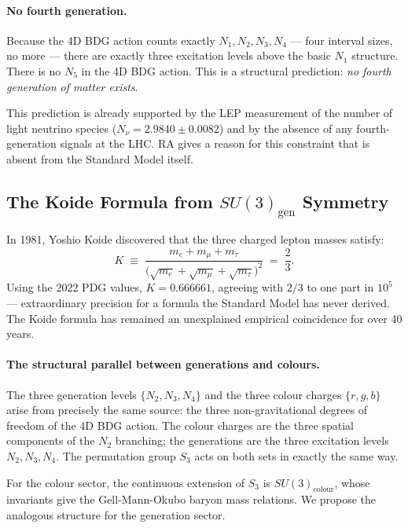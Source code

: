 \documentclass[11pt,a4paper]{article}
\begin{document}
\paragraph{No fourth generation.}
Because the 4D BDG action counts exactly $N_1, N_2, N_3, N_4$ --- four interval
sizes, no more --- there are exactly three excitation levels above the basic
$N_1$ structure. There is no $N_5$ in the 4D BDG action. This is a structural
prediction: \emph{no fourth generation of matter exists}.

This prediction is already supported by the LEP measurement of the number of
light neutrino species ($N_\nu = 2.9840 \pm 0.0082$) and by the absence of
any fourth-generation signals at the LHC. RA gives a reason for this
constraint that is absent from the Standard Model itself.

\subsection{The Koide Formula from $SU(3)_{\mathrm{gen}}$ Symmetry}
\label{sec:koide}

In 1981, Yoshio Koide discovered that the three charged lepton masses satisfy:
\begin{equation}
  K \;\equiv\; \frac{m_e + m_\mu + m_\tau}{\bigl(\sqrt{m_e} + \sqrt{m_\mu}
  + \sqrt{m_\tau}\bigr)^2} \;=\; \frac{2}{3}.
  \label{eq:koide}
\end{equation}
Using the 2022 PDG values, $K = 0.666661$, agreeing with $2/3$ to one part
in $10^5$ --- extraordinary precision for a formula the Standard Model has
never derived. The Koide formula has remained an unexplained empirical
coincidence for over 40 years.

\paragraph{The structural parallel between generations and colours.}
The three generation levels $\{N_2, N_3, N_4\}$ and the three colour charges
$\{r, g, b\}$ arise from precisely the same source: the three non-gravitational
degrees of freedom of the 4D BDG action. The colour charges are the three
spatial components of the $N_2$ branching; the generations are the three
excitation levels $N_2, N_3, N_4$. The permutation group $S_3$ acts
on both sets in exactly the same way.

For the colour sector, the continuous extension of $S_3$ is $SU(3)_{\mathrm{colour}}$,
whose invariants give the Gell-Mann-Okubo baryon mass relations. We propose
the analogous structure for the generation sector.
\end{document}
